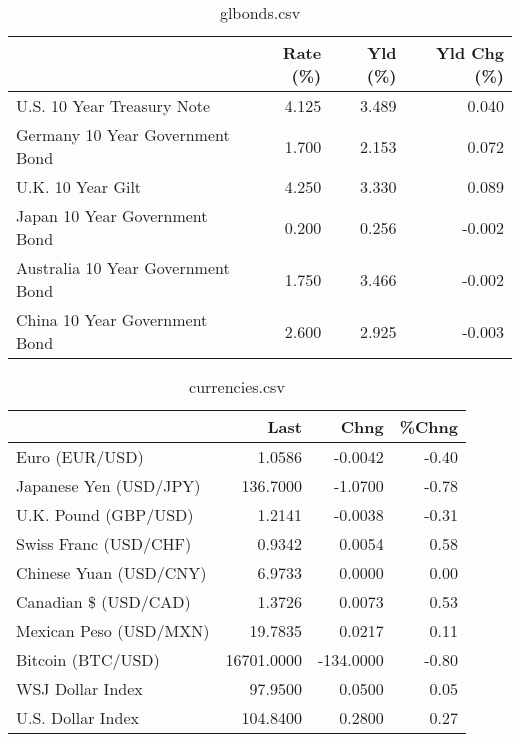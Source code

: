\documentclass{article}%
\begin{document}
%


\begin{table}[htbp]%
\caption{glbonds.csv}%
\centering%
\begin{adjustbox}{width=1\textwidth}%
\begin{tabular}{lrrr}
\toprule
                                  &  Rate (\%) &  Yld (\%) &  Yld Chg (\%) \\
\midrule
       U.S. 10 Year Treasury Note &     4.125 &    3.489 &        0.040 \\
  Germany 10 Year Government Bond &     1.700 &    2.153 &        0.072 \\
                U.K. 10 Year Gilt &     4.250 &    3.330 &        0.089 \\
    Japan 10 Year Government Bond &     0.200 &    0.256 &       -0.002 \\
Australia 10 Year Government Bond &     1.750 &    3.466 &       -0.002 \\
    China 10 Year Government Bond &     2.600 &    2.925 &       -0.003 \\
\bottomrule
\end{tabular}
%
\end{adjustbox}%
\end{table}

%


\begin{table}[htbp]%
\caption{currencies.csv}%
\centering%
\begin{adjustbox}{width=1\textwidth}%
\begin{tabular}{lrrr}
\toprule
                       &       Last &      Chng &  \%Chng \\
\midrule
        Euro (EUR/USD) &     1.0586 &   -0.0042 &  -0.40 \\
Japanese Yen (USD/JPY) &   136.7000 &   -1.0700 &  -0.78 \\
  U.K. Pound (GBP/USD) &     1.2141 &   -0.0038 &  -0.31 \\
 Swiss Franc (USD/CHF) &     0.9342 &    0.0054 &   0.58 \\
Chinese Yuan (USD/CNY) &     6.9733 &    0.0000 &   0.00 \\
  Canadian \$ (USD/CAD) &     1.3726 &    0.0073 &   0.53 \\
Mexican Peso (USD/MXN) &    19.7835 &    0.0217 &   0.11 \\
     Bitcoin (BTC/USD) & 16701.0000 & -134.0000 &  -0.80 \\
      WSJ Dollar Index &    97.9500 &    0.0500 &   0.05 \\
     U.S. Dollar Index &   104.8400 &    0.2800 &   0.27 \\
\bottomrule
\end{tabular}
%
\end{adjustbox}%
\end{table}

%
\end{document}
